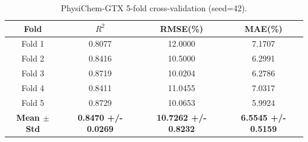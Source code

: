 \begin{table}[htbp]
\centering
\caption{PhysiChem-GTX 5-fold cross-validation (seed=42).}
\label{tab:cv}
\begin{tabular}{cccc}
\toprule
Fold & $R^2$ & RMSE(\%) & MAE(\%) \\
\midrule
Fold 1 & 0.8077 & 12.0000 & 7.1707 \\
Fold 2 & 0.8416 & 10.5000 & 6.2991 \\
Fold 3 & 0.8719 & 10.0204 & 6.2786 \\
Fold 4 & 0.8411 & 11.0455 & 7.0317 \\
Fold 5 & 0.8729 & 10.0653 & 5.9924 \\
\midrule
\textbf{Mean $\pm$ Std} & \textbf{0.8470 +/- 0.0269} & \textbf{10.7262 +/- 0.8232} & \textbf{6.5545 +/- 0.5159} \\
\bottomrule
\end{tabular}
\end{table}
